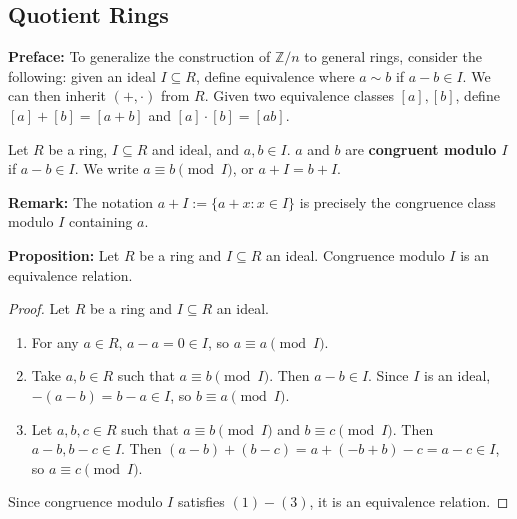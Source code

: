 \documentclass [12pt] {article}
\newcommand{\Z}{\mathbb{Z}}
\newenvironment{definition}[1]{\begin{tcolorbox}[title={Definition: #1},colback=blue!5!white,colframe=black!75!blue]}{\end{tcolorbox}}
\renewcommand{\bf}[1]{\textbf{{#1}}}
\begin{document}
\subsection{Quotient Rings}
\bf{Preface:} To generalize the construction of $\Z/n$ to general rings, consider the following:
given an ideal $I \subseteq R$, define equivalence where $a \sim b$ if $a - b \in I$. We
can then inherit $(+, \cdot)$ from $R$. Given two equivalence classes $[a], [b]$, define 
$[a] + [b] = [a + b]$ and $[a] \cdot [b] = [ab]$.
\begin{definition}{Congruent Modulo $I$}
    Let $R$ be a ring, $I \subseteq R$ and ideal, and $a, b \in I$. $a$ and $b$ are \bf{congruent 
    modulo $I$} if $a - b \in I$. We write $a \equiv b \pmod{I}$, or $a + I = b + I$.
    \vspace{0.5em}

    \bf{Remark:} The notation $a + I := \{ a + x : x \in I \}$ is precisely the congruence class modulo
    $I$ containing $a$.
\end{definition}
\bf{Proposition:} Let $R$ be a ring and $I \subseteq R$ an ideal. Congruence modulo $I$ is an
equivalence relation.
\begin{proof}
    Let $R$ be a ring and $I \subseteq R$ an ideal.
    \begin{enumerate}[label=(\arabic*)]
        \item For any $a \in R$, $a - a = 0 \in I$, so $a \equiv a \pmod{I}$.
        \item Take $a, b \in R$ such that $a \equiv b \pmod{I}$. Then $a - b \in I$. Since $I$ is an
            ideal, $-(a - b) = b - a \in I$, so $b \equiv a \pmod{I}$.
        \item Let $a, b, c \in R$ such that $a \equiv b \pmod{I}$ and $b \equiv c \pmod{I}$. Then
            $a - b, b - c \in I$. Then $(a - b) + (b - c) = a + (-b + b) - c = a - c \in I$, so
            $a \equiv c \pmod{I}$.
    \end{enumerate}
    Since congruence modulo $I$ satisfies $(1)-(3)$, it is an equivalence relation.
\end{proof}
\end{document}
